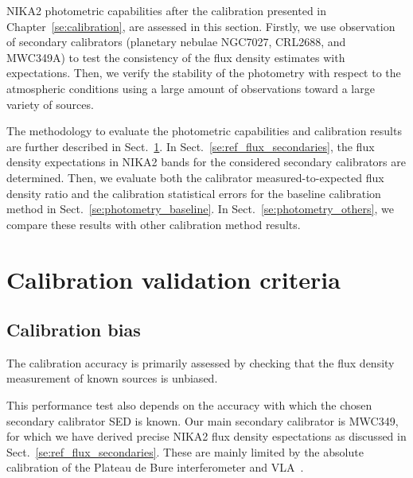 
NIKA2 photometric capabilities after the calibration presented in
Chapter~\ref{se:calibration}, are assessed in this section. Firstly,
we use observation of secondary calibrators (planetary nebulae NGC7027, CRL2688, and
MWC349A) to test the consistency of the flux density estimates with
expectations. Then, we verify the stability of the photometry with
respect to the atmospheric conditions using a large amount of
observations toward a large variety of sources. 


The methodology to evaluate the photometric
capabilities and calibration results are further described in
Sect.~\ref{se:photometry_criteria}.
In Sect.~\ref{se:ref_flux_secondaries}, the flux density expectations
in NIKA2 bands for the considered secondary calibrators are
determined. Then, we evaluate both the calibrator measured-to-expected
flux density ratio and the calibration statistical errors for the
baseline calibration method in Sect.~\ref{se:photometry_baseline}. 
In Sect.~\ref{se:photometry_others}, we compare these results with other
calibration method results. 

\section{Calibration validation criteria}%
\label{se:photometry_criteria}

\subsection{Calibration bias}
The calibration accuracy is primarily assessed by checking
that the flux density measurement of known sources is unbiased.

This performance test also depends on the accuracy with which the
chosen secondary calibrator SED is known. Our main secondary
calibrator is MWC349, for which we have derived precise NIKA2 flux
density espectations as discussed in
Sect.~\ref{se:ref_flux_secondaries}.
These are mainly limited by the absolute calibration of the Plateau de
Bure interferometer and VLA~\cite{krips}.

